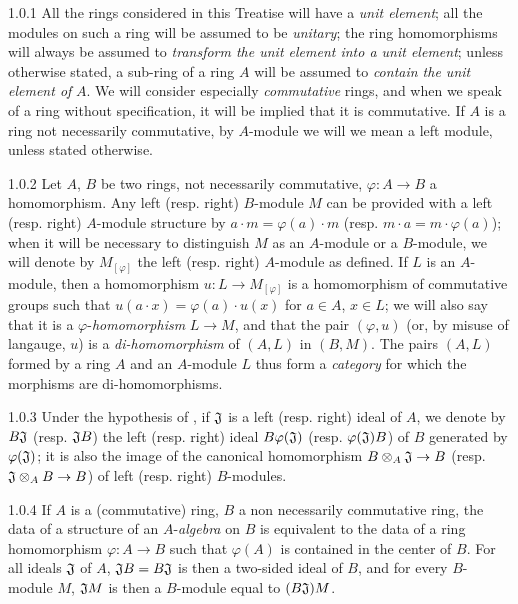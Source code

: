 \documentclass[../main.tex]{subfiles}
\begin{document}
\begin{env}{1.0.1}
All the rings considered in this Treatise will have a \emph{unit element}; all the modules
on such a ring will be assumed to be \emph{unitary}; the ring homomorphisms will always be
assumed to \emph{transform the unit element into a unit element}; unless otherwise stated,
a sub-ring of a ring $A$ will be assumed to \emph{contain the unit element of} $A$. We will
consider especially \emph{commutative} rings, and when we speak of a ring without
specification, it
will be implied that it is commutative. If $A$ is a ring not necessarily commutative, by
$A$-module we will we mean a left module, unless stated otherwise.
\end{env}

\begin{env}{1.0.2}
Let $A$, $B$ be two rings, not necessarily commutative, $\varphi:A\to B$ a homomorphism.
Any left (resp. right) $B$-module $M$ can be provided with a left (resp. right) $A$-module
structure by $a\cdot m=\varphi(a)\cdot m$ (resp. $m\cdot a=m\cdot\varphi(a)$); when it will
be necessary to distinguish $M$ as an $A$-module or a $B$-module, we will denote by
$M_{[\varphi]}$ the left (resp. right) $A$-module as defined. If $L$ is an $A$-module, then
a homomorphism $u:L\to M_{[\varphi]}$ is a homomorphism of commutative groups such that
$u(a\cdot x)=\varphi(a)\cdot u(x)$ for $a\in A$, $x\in L$; we will also say that it is a
$\varphi$-\emph{homomorphism} $L\to M$,
and that the pair $(\varphi,u)$ (or, by misuse of langauge, $u$)
is a \emph{di-homomorphism} of $(A,L)$ in $(B,M)$. The pairs $(A,L)$ formed by a ring $A$
and an $A$-module $L$ thus form a \emph{category} for which the morphisms are
di-homomorphisms.
\end{env}

\begin{env}{1.0.3}
Under the hypothesis of , if $\mathfrak{J}$ is a left (resp. right) ideal of $A$, we
denote by $B\mathfrak{J}$ (resp. $\mathfrak{J}B$) the left (resp. right) ideal $B\varphi(\mathfrak{J})$
(resp. $\varphi(\mathfrak{J})B$) of $B$ generated by $\varphi(\mathfrak{J})$; it is also the image
of the canonical homomorphism $B\otimes_A\mathfrak{J}\to B$ (resp. $\mathfrak{J}\otimes_A B\to B$)
of left (resp. right) $B$-modules.
\end{env}

\begin{env}{1.0.4}
If $A$ is a (commutative) ring, $B$ a non necessarily commutative ring, the data of
a structure of an $A$-\emph{algebra} on $B$ is equivalent to the data of a ring
homomorphism $\varphi:A\to B$ such that $\varphi(A)$ is contained in the center of $B$.
For all ideals $\mathfrak{J}$ of $A$, $\mathfrak{J}B=B\mathfrak{J}$ is then a two-sided ideal of $B$, and
for every $B$-module $M$, $\mathfrak{J}M$ is then a $B$-module equal to $(B\mathfrak{J})M$.
\end{env}
\end{document}
